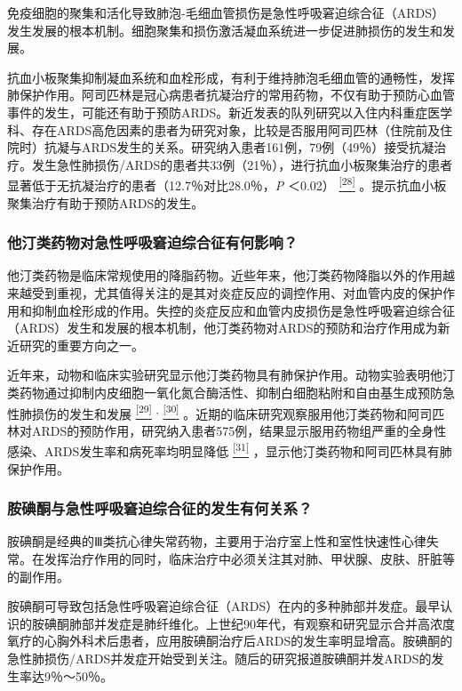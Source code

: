 免疫细胞的聚集和活化导致肺泡-毛细血管损伤是急性呼吸窘迫综合征（ARDS）发生发展的根本机制。细胞聚集和损伤激活凝血系统进一步促进肺损伤的发生和发展。

抗血小板聚集抑制凝血系统和血栓形成，有利于维持肺泡毛细血管的通畅性，发挥肺保护作用。阿司匹林是冠心病患者抗凝治疗的常用药物，不仅有助于预防心血管事件的发生，可能还有助于预防ARDS。新近发表的队列研究以入住内科重症医学科、存在ARDS高危因素的患者为研究对象，比较是否服用阿司匹林（住院前及住院时）抗凝与ARDS发生的关系。研究纳入患者161例，79例（49％）接受抗凝治疗。发生急性肺损伤/ARDS的患者共33例（21％），进行抗血小板聚集治疗的患者显著低于无抗凝治疗的患者（12.7％对比28.0％，\emph{P}
＜0.02）
\protect\hyperlink{text00011.htmlux5cux23ch28-10}{\textsuperscript{{[}28{]}}}
。提示抗血小板聚集治疗有助于预防ARDS的发生。

\subsubsection{他汀类药物对急性呼吸窘迫综合征有何影响？}

他汀类药物是临床常规使用的降脂药物。近些年来，他汀类药物降脂以外的作用越来越受到重视，尤其值得关注的是其对炎症反应的调控作用、对血管内皮的保护作用和抑制血栓形成的作用。失控的炎症反应和血管内皮损伤是急性呼吸窘迫综合征（ARDS）发生和发展的根本机制，他汀类药物对ARDS的预防和治疗作用成为新近研究的重要方向之一。

近年来，动物和临床实验研究显示他汀类药物具有肺保护作用。动物实验表明他汀类药物通过抑制内皮细胞一氧化氮合酶活性、抑制白细胞粘附和自由基生成预防急性肺损伤的发生和发展
\protect\hyperlink{text00011.htmlux5cux23ch29-10}{\textsuperscript{{[}29{]}}}
\textsuperscript{,}
\protect\hyperlink{text00011.htmlux5cux23ch30-10}{\textsuperscript{{[}30{]}}}
。近期的临床研究观察服用他汀类药物和阿司匹林对ARDS的预防作用，研究纳入患者575例，结果显示服用药物组严重的全身性感染、ARDS发生率和病死率均明显降低
\protect\hyperlink{text00011.htmlux5cux23ch31-10}{\textsuperscript{{[}31{]}}}
，显示他汀类药物和阿司匹林具有肺保护作用。

\subsubsection{胺碘酮与急性呼吸窘迫综合征的发生有何关系？}

胺碘酮是经典的Ⅲ类抗心律失常药物，主要用于治疗室上性和室性快速性心律失常。在发挥治疗作用的同时，临床治疗中必须关注其对肺、甲状腺、皮肤、肝脏等的副作用。

胺碘酮可导致包括急性呼吸窘迫综合征（ARDS）在内的多种肺部并发症。最早认识的胺碘酮肺部并发症是肺纤维化。上世纪90年代，有观察和研究显示合并高浓度氧疗的心胸外科术后患者，应用胺碘酮治疗后ARDS的发生率明显增高。胺碘酮的急性肺损伤/ARDS并发症开始受到关注。随后的研究报道胺碘酮并发ARDS的发生率达9％～50％。

